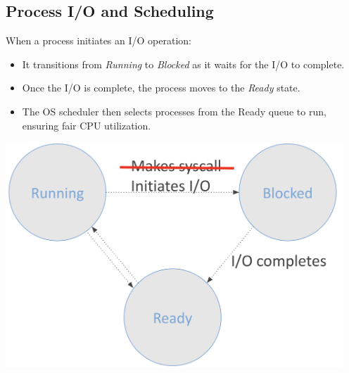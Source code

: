 \subsection{Process I/O and Scheduling}
When a process initiates an I/O operation:\\
\begin{minipage}[htp]{0.45\textwidth}
\begin{itemize}
  \item It transitions from \emph{Running} to \emph{Blocked} as it waits for the I/O to complete.
  \item Once the I/O is complete, the process moves to the \emph{Ready} state.
  \item The OS scheduler then selects processes from the Ready queue to run, ensuring fair CPU utilization.
\end{itemize}
\end{minipage} 
\hfill 
\vline 
\hfill 
\begin{minipage}[htp]{0.45\textwidth}
\begin{center}
  \includegraphics[width=0.95\textwidth]{chapters/L3/images/diagram.png}
\end{center}
\end{minipage}
\vspace{20px}
